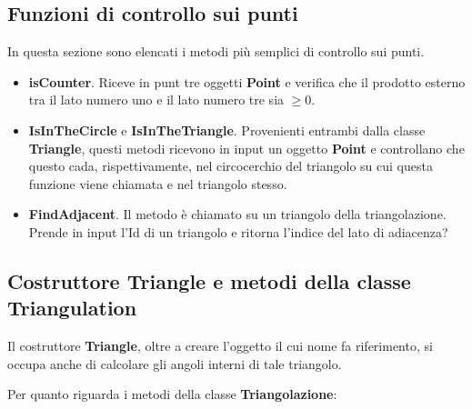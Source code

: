 \documentclass{article}
\begin{document}
\subsection{Funzioni di controllo sui punti}
In questa sezione sono elencati i metodi più semplici di controllo sui punti.

\begin{itemize}
\item \textbf{isCounter}.  Riceve in punt tre oggetti \textbf{Point} e verifica che il prodotto esterno tra il lato numero uno e il lato numero tre sia $\geq 0$.
\item \textbf{IsInTheCircle} e \textbf{IsInTheTriangle}.  Provenienti entrambi dalla classe \textbf{Triangle},  questi metodi ricevono in input un oggetto \textbf{Point} e controllano che questo cada,  rispettivamente, nel circocerchio del triangolo su cui questa funzione viene chiamata e nel triangolo stesso.
\item \textbf{FindAdjacent}.  Il metodo è chiamato su un triangolo della triangolazione.  Prende in input l'Id di un triangolo e ritorna l'indice del lato di adiacenza?
\end{itemize}

\subsection{Costruttore Triangle e metodi della classe Triangulation}
Il costruttore \textbf{Triangle},  oltre a creare l'oggetto il cui nome fa riferimento,  si occupa anche di calcolare gli angoli interni di tale triangolo.

Per quanto riguarda i metodi della classe \textbf{Triangolazione}:
\end{document}
